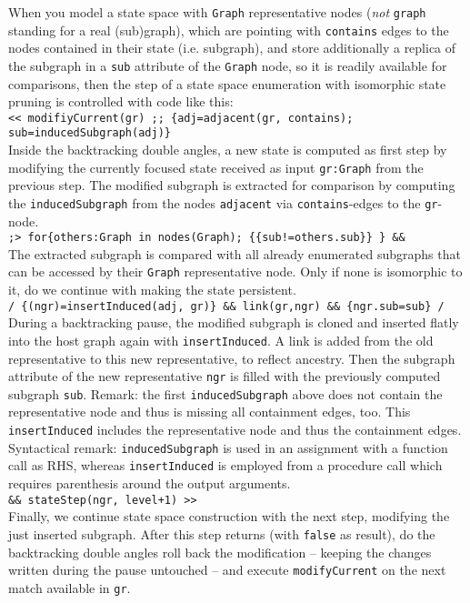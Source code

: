 \begin{example}
When you model a state space with \texttt{Graph} representative nodes (\emph{not} \texttt{graph} standing for a real (sub)graph), which are pointing with \texttt{contains} edges to the nodes contained in their state (i.e. subgraph), and store additionally a replica of the subgraph in a \texttt{sub} attribute of the \texttt{Graph} node, so it is readily available for comparisons,
then the step of a state space enumeration with isomorphic state pruning is controlled with code like this:\\
\verb#<< modifiyCurrent(gr) ;; {adj=adjacent(gr, contains); sub=inducedSubgraph(adj)}#\\
Inside the backtracking double angles, a new state is computed as first step by modifying the currently focused state received as input \texttt{gr:Graph} from the previous step. The modified subgraph is extracted for comparison by computing the \texttt{inducedSubgraph} from the nodes \texttt{adjacent} via \texttt{contains}-edges to the \texttt{gr}-node.\\
\verb#;> for{others:Graph in nodes(Graph); {{sub!=others.sub}} } && #\\
The extracted subgraph is compared with all already enumerated subgraphs that can be accessed by their \texttt{Graph} representative node. Only if none is isomorphic to it, do we continue with making the state persistent.\\
\verb#/ {(ngr)=insertInduced(adj, gr)} && link(gr,ngr) && {ngr.sub=sub} /#\\
During a backtracking pause, the modified subgraph is cloned and inserted flatly into the host graph again with \texttt{insertInduced}. A link is added from the old representative to this new representative, to reflect ancestry. Then the subgraph attribute of the new representative \texttt{ngr} is filled with the previously computed subgraph \texttt{sub}. Remark: the first \texttt{inducedSubgraph} above does not contain the representative node and thus is missing all containment edges, too. This \texttt{insertInduced} includes the representative node and thus the containment edges. Syntactical remark: \texttt{inducedSubgraph} is used in an assignment with a function call as RHS, whereas \texttt{insertInduced} is employed from a procedure call which requires parenthesis around the output arguments.\\
\verb#&& stateStep(ngr, level+1) >>#\\
Finally, we continue state space construction with the next step, modifying the just inserted subgraph.
After this step returns (with \texttt{false} as result), do the backtracking double angles roll back the modification -- keeping the changes written during the pause untouched -- and execute \texttt{modifyCurrent} on the next match available in \texttt{gr}.
\end{example}

